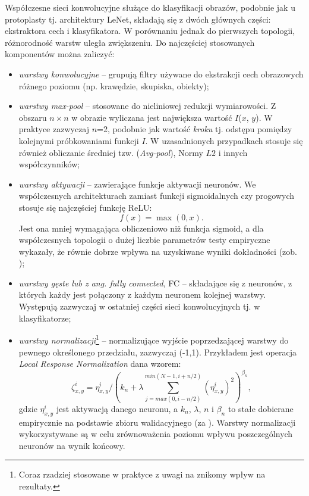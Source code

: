 Współczesne sieci konwolucyjne służące do klasyfikacji obrazów, podobnie jak u protoplasty tj. architektury LeNet, składają się z dwóch głównych części: ekstraktora cech i klasyfikatora. W porównaniu jednak do pierwszych topologii, różnorodność warstw uległa zwiększeniu. Do najczęściej stosowanych komponentów można zaliczyć:
\begin{itemize}[noitemsep,nolistsep]
	\item \textit{warstwy konwolucyjne} -- grupują filtry używane do ekstrakcji cech obrazowych różnego poziomu (np. krawędzie, skupiska, obiekty);
	\item \textit{warstwy max-pool} -- stosowane do nieliniowej redukcji wymiarowości. Z obszaru $n\times$$n$ w obrazie wyliczana jest największa wartość $I$($x$, $y$). W praktyce zazwyczaj $n$=2, podobnie jak wartość \textit{kroku} tj. odstępu pomiędzy kolejnymi próbkowaniami funkcji $I$. W uzasadnionych przypadkach stosuje się również obliczanie średniej tzw. (\textit{Avg-pool}), Normy $L2$ i innych współczynników;
	\item \textit{warstwy aktywacji} -- zawierające funkcje aktywacji neuronów. We współczesnych architekturach zamiast funkcji sigmoidalnych czy progowych stosuje się najczęściej funkcję ReLU:
	\begin{equation}
		f(x) = \max(0, x).
	\end{equation}
	Jest ona mniej wymagająca obliczeniowo niż funkcja sigmoid, a dla współczesnych topologii o dużej liczbie parametrów testy empiryczne wykazały, \linebreak że równie dobrze wpływa na uzyskiwane wyniki dokładności (zob. \cite{Krizhevsky2012}); 
	\item \textit{warstwy gęste lub z ang. fully connected}, FC -- składające się z neuronów, \linebreak z których każdy jest połączony z każdym neuronem kolejnej warstwy. Występują zazwyczaj w ostatniej części sieci konwolucyjnych tj. w klasyfikatorze;
	\item \textit{warstwy normalizacji}\footnote{Coraz rzadziej stosowane w praktyce z uwagi na znikomy wpływ na rezultaty.} -- normalizujące wyjście poprzedzającej warstwy \linebreak do pewnego określonego przedziału, zazwyczaj (-1,1). Przykładem jest operacja \textit{Local Response Normalization} dana wzorem:
	\begin{equation}
	\label{DLnormEquation}
	\zeta_{x,y}^{i} = \eta_{x,y}^{i}/\left ( k_n + \lambda \sum_{j=max(0,i-n/2)}^{min(N-1,i+n/2)}(\eta_{x,y}^{i})^2 \right )^{\beta_n},
	\end{equation}
	gdzie $\eta_{x,y}^{i}$ jest aktywacją danego neuronu, a $k_n$, $\lambda$, $n$ i $\beta_n$ to stałe dobierane empirycznie na podstawie zbioru walidacyjnego (za \cite{Krizhevsky2012}). Warstwy normalizacji wykorzystywane są w celu zrównoważenia poziomu wpływu poszczególnych neuronów na wynik końcowy.
\end{itemize}

